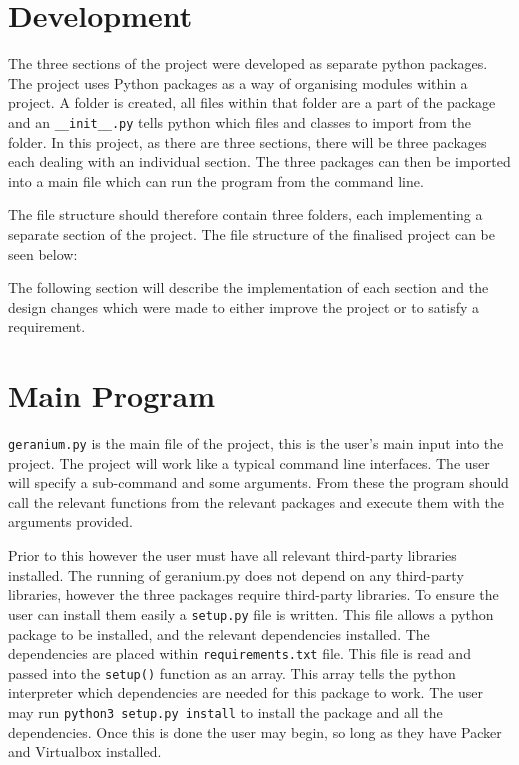 \section{Development}

The three sections of the project were developed as separate python packages. The project uses Python packages as a way of organising modules within a project. A folder is created, all files within that folder are a part of the package and an \texttt{\_\_init\_\_.py} tells python which files and classes to import from the  folder. In this project, as there are three sections, there will be three packages each dealing with an individual section. The three packages can then be imported into a main file which can run the program from the command line. 

The file structure should therefore contain three folders, each implementing a separate section of the project. The file structure of the finalised project can be seen below:


The following section will describe the implementation of each section and the design changes which were made to either improve the project or to satisfy a requirement.

\section{Main Program}

\texttt{geranium.py} is the main file of the project, this is the user's main input into the project. The project will work like a typical command line interfaces. The user will specify a sub-command and some arguments. From these the program should call the relevant functions from the relevant packages and execute them with the arguments provided. 

Prior to this however the user must have all relevant third-party libraries installed. The running of geranium.py does not depend on any third-party libraries, however the three packages require third-party libraries. To ensure the user can install them easily a \texttt{setup.py} file is written. This file allows a python package to be installed, and the relevant dependencies installed. The dependencies are placed within \texttt{requirements.txt} file. This file is read and passed into the \texttt{setup()} function as an array. This array tells the python interpreter which dependencies are needed for this package to work. The user may run \texttt{python3 setup.py install} to install the package and all the dependencies. Once this is done the user may begin, so long as they have Packer and Virtualbox installed.

